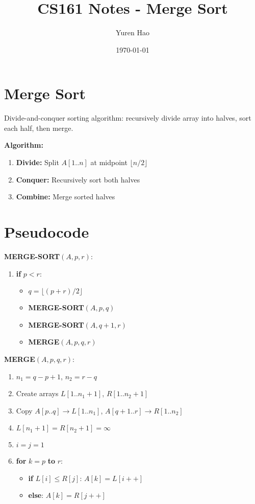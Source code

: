 \documentclass{article}
\title{CS161 Notes - Merge Sort}
\author{Yuren Hao}
\date{\today}
\begin{document}
\maketitle

\section{Merge Sort}

Divide-and-conquer sorting algorithm: recursively divide array into halves, sort each half, then merge.

\textbf{Algorithm:}
\begin{enumerate}
    \item \textbf{Divide:} Split $A[1..n]$ at midpoint $\lfloor n/2 \rfloor$
    \item \textbf{Conquer:} Recursively sort both halves
    \item \textbf{Combine:} Merge sorted halves
\end{enumerate}

\section{Pseudocode}

\textbf{MERGE-SORT}$(A, p, r)$:
\begin{enumerate}
    \item \textbf{if} $p < r$:
    \begin{itemize}
        \item $q = \lfloor (p + r) / 2 \rfloor$
        \item \textbf{MERGE-SORT}$(A, p, q)$
        \item \textbf{MERGE-SORT}$(A, q + 1, r)$
        \item \textbf{MERGE}$(A, p, q, r)$
    \end{itemize}
\end{enumerate}

\textbf{MERGE}$(A, p, q, r)$:
\begin{enumerate}
    \item $n_1 = q - p + 1$, $n_2 = r - q$
    \item Create arrays $L[1..n_1 + 1]$, $R[1..n_2 + 1]$
    \item Copy $A[p..q] \to L[1..n_1]$, $A[q+1..r] \to R[1..n_2]$
    \item $L[n_1 + 1] = R[n_2 + 1] = \infty$
    \item $i = j = 1$
    \item \textbf{for} $k = p$ \textbf{to} $r$:
    \begin{itemize}
        \item \textbf{if} $L[i] \leq R[j]$: $A[k] = L[i++]$
        \item \textbf{else}: $A[k] = R[j++]$
    \end{itemize}
\end{enumerate}
\end{document}
